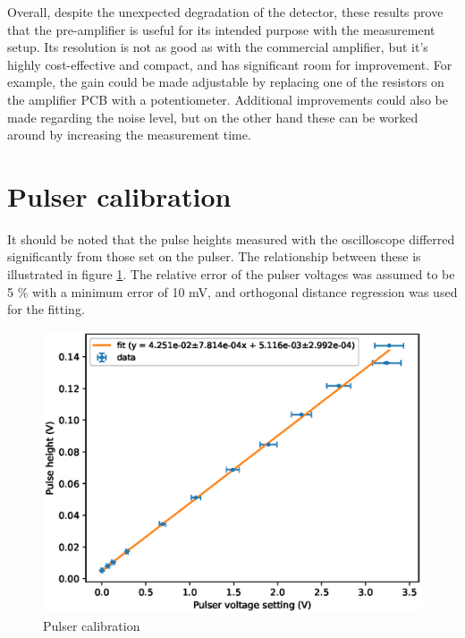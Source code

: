 \documentclass[a4paper]{article}
\begin{document}
\begin{appendices}
\FloatBarrier
Overall, despite the unexpected degradation of the detector, these results prove that the pre-amplifier is useful for its intended purpose with the measurement setup.
Its resolution is not as good as with the commercial amplifier, but it's highly cost-effective and compact, and has significant room for improvement.
For example, the gain could be made adjustable by replacing one of the resistors on the amplifier PCB with a potentiometer.
Additional improvements could also be made regarding the noise level, but on the other hand these can be worked around by increasing the measurement time.



\clearpage
\section{Pulser calibration}
\label{pulser_calibration}
It should be noted that the pulse heights measured with the oscilloscope differred significantly from those set on the pulser.
The relationship between these is illustrated in figure \ref{fig:pulser_calibration}.
The relative error of the pulser voltages was assumed to be 5 \% with a minimum error of 10 mV, and orthogonal distance regression was used for the fitting.

\begin{figure}[ht!]
\centering
\includegraphics[width=\textwidth]{fig/python/pulser_calibration.eps}
\caption{Pulser calibration}
\label{fig:pulser_calibration}
\end{figure}



\clearpage

\end{appendices}
\end{document}
